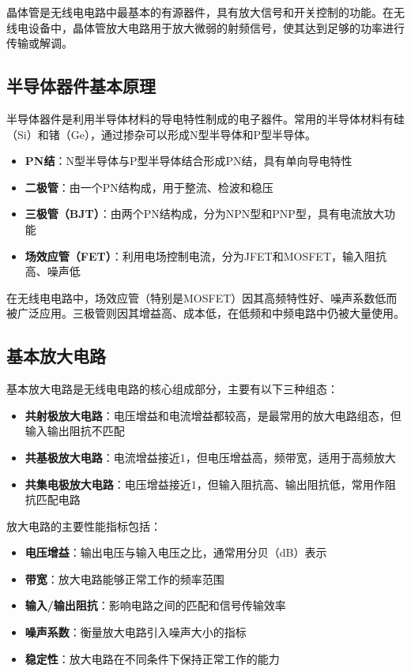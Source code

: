 \documentclass[12pt,UTF8]{ctexbook}
\begin{document}
晶体管是无线电电路中最基本的有源器件，具有放大信号和开关控制的功能。在无线电设备中，晶体管放大电路用于放大微弱的射频信号，使其达到足够的功率进行传输或解调。

\subsection{半导体器件基本原理}

半导体器件是利用半导体材料的导电特性制成的电子器件。常用的半导体材料有硅（Si）和锗（Ge），通过掺杂可以形成N型半导体和P型半导体。

\begin{itemize}[leftmargin=3.5em]
    \item \textbf{PN结}：N型半导体与P型半导体结合形成PN结，具有单向导电特性
    \item \textbf{二极管}：由一个PN结构成，用于整流、检波和稳压
    \item \textbf{三极管（BJT）}：由两个PN结构成，分为NPN型和PNP型，具有电流放大功能
    \item \textbf{场效应管（FET）}：利用电场控制电流，分为JFET和MOSFET，输入阻抗高、噪声低
\end{itemize}

在无线电电路中，场效应管（特别是MOSFET）因其高频特性好、噪声系数低而被广泛应用。三极管则因其增益高、成本低，在低频和中频电路中仍被大量使用。

\subsection{基本放大电路}

基本放大电路是无线电电路的核心组成部分，主要有以下三种组态：

\begin{itemize}[leftmargin=3.5em]
    \item \textbf{共射极放大电路}：电压增益和电流增益都较高，是最常用的放大电路组态，但输入输出阻抗不匹配
    \item \textbf{共基极放大电路}：电流增益接近1，但电压增益高，频带宽，适用于高频放大
    \item \textbf{共集电极放大电路}：电压增益接近1，但输入阻抗高、输出阻抗低，常用作阻抗匹配电路
\end{itemize}

放大电路的主要性能指标包括：
\begin{itemize}[leftmargin=3.5em]
    \item \textbf{电压增益}：输出电压与输入电压之比，通常用分贝（dB）表示
    \item \textbf{带宽}：放大电路能够正常工作的频率范围
    \item \textbf{输入/输出阻抗}：影响电路之间的匹配和信号传输效率
    \item \textbf{噪声系数}：衡量放大电路引入噪声大小的指标
    \item \textbf{稳定性}：放大电路在不同条件下保持正常工作的能力
\end{itemize}
\end{document}
